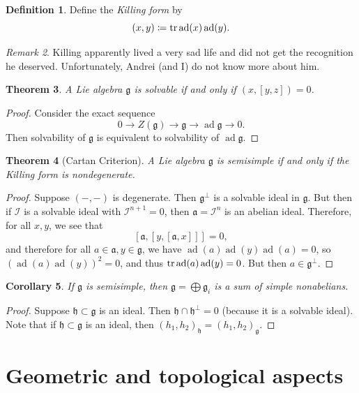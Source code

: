 \documentclass[leqno, openany]{memoir}
\newtheorem{thm}{Theorem}[section]
\newtheorem{cor}[thm]{Corollary}
\theoremstyle{definition}
\newtheorem{defn}[thm]{Definition}
\theoremstyle{remark}
\newtheorem{rmk}[thm]{Remark}
\theoremstyle{plain}
\theoremstyle{definition}
\theoremstyle{remark}
\newcommand{\mc}[1]{\mathcal{#1}}
\newcommand{\mf}[1]{\mathfrak{#1}}
\DeclareMathOperator{\ad}{ad}
\begin{document}
\begin{defn}
    Define the \textit{Killing form} by
    \[ (x,y) \coloneqq \tr \ad(x) \ad(y). \]
\end{defn}

\begin{rmk}
    Killing apparently lived a very sad life and did not get the recognition he deserved. Unfortunately, Andrei (and I) do not know more about him.
\end{rmk}

\begin{thm}
    A Lie algebra $\mf{g}$ is solvable if and only if $(x, [y,z]) = 0$.
\end{thm}

\begin{proof}
    Consider the exact sequence
    \[ 0 \to Z(\mf{g}) \to \mf{g} \to \ad \mf{g} \to 0. \]
    Then solvability of $\mf{g}$ is equivalent to solvability of $\ad \mf{g}$.
\end{proof}

\begin{thm}[Cartan Criterion]
    A Lie algebra $\mf{g}$ is semisimple if and only if the Killing form is nondegenerate.
\end{thm}

\begin{proof}
    Suppose $(-,-)$ is degenerate. Then $\mf{g}^{\perp}$ is a solvable ideal in $\mf{g}$. But then if $\mc{I}$ is a solvable ideal with $\mc{I}^{n+1} = 0$, then $\mf{a} = \mc{I}^n$ is an abelian ideal. Therefore, for all $x,y$, we see that
    \[ [\mf{a}, [y,[\mf{a}, x]]] = 0, \]
    and therefore for all $a \in \mf{a}, y \in \mf{g}$, we have $\ad (a) \ad(y) \ad(a) = 0$, so ${(\ad(a) \ad(y))}^2 = 0$, and thus $\tr \ad(a) \ad(y) = 0$. But then $a \in \mf{g}^{\perp}$.
\end{proof}

\begin{cor}
    If $\mf{g}$ is semisimple, then $\mf{g} = \bigoplus \mf{g}_i$ is a sum of simple nonabelians.
\end{cor}

\begin{proof}
    Suppose $\mf{h} \subset \mf{g}$ is an ideal. Then $\mf{h} \cap \mf{h}^{\perp} = 0$ (because it is a solvable ideal). Note that if $\mf{h} \subset \mf{g}$ is an ideal, then ${(h_1, h_2)}_{\mf{h}} = {(h_1, h_2)}_{\mf{g}}$.
\end{proof}

\chapter{Geometric and topological aspects}%
\label{cha:cohomology}
\end{document}

